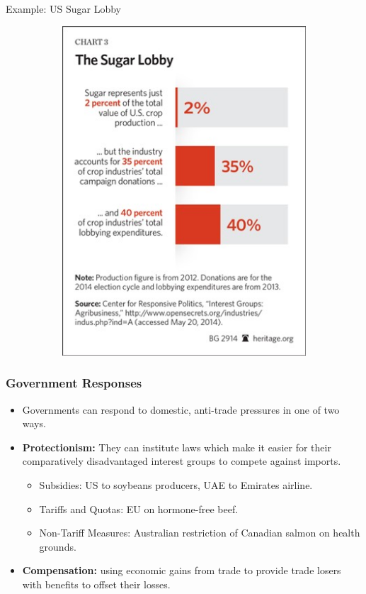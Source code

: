 \documentclass{beamer}
\begin{document}
\begin{frame}{\LARGE Example: US Sugar Lobby}
\begin{figure}
\begin{subfigure}{0.49\textwidth}
			\includegraphics[width = \textwidth, height=.9\textheight]{sugar2.jpg}
		\end{subfigure}
	\end{figure}
\end{frame}

\begin{frame} 
	\frametitle{\LARGE Government Responses}
	\begin{itemize}
			\item Governments can respond to domestic, anti-trade pressures in one of two ways. \pause 
			\item \textbf{Protectionism:} \pause They can institute laws which make it easier for their comparatively disadvantaged interest groups to compete against imports. \pause 
			\begin{itemize}
				\item Subsidies: US to soybeans producers, UAE to Emirates airline. \pause
				\item Tariffs and Quotas: EU on hormone-free beef. \pause 
				\item Non-Tariff Measures: Australian restriction of Canadian salmon on health grounds. \pause 
			\end{itemize}
			\item \textbf{Compensation:} \pause using economic gains from trade to provide trade losers with benefits to offset their losses.
	\end{itemize}
\end{frame}
\end{document}
